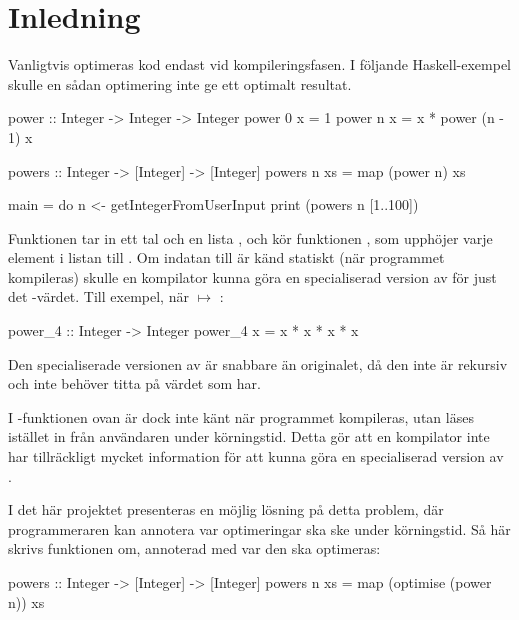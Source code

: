 \documentclass[Rapport]{subfiles}
\begin{document}
\section{Inledning}

Vanligtvis optimeras kod endast vid kompileringsfasen. I följande Haskell-exempel 
skulle en sådan optimering inte ge ett optimalt resultat.

\begin{codeEx}
power :: Integer -> Integer -> Integer
power 0 x = 1
power n x = x * power (n - 1) x

powers :: Integer -> [Integer] -> [Integer]
powers n xs = map (power n) xs

main = do
    n <- getIntegerFromUserInput
    print (powers n [1..100])

\end{codeEx}

Funktionen  tar in ett tal  och en lista , och kör funktionen , 
som upphöjer varje element i listan till .
Om indatan  till 
 är känd statiskt (när programmet kompileras) skulle en kompilator kunna 
göra en specialiserad version av  för just det -värdet. Till exempel, när  $\mapsto$ :

\begin{codeEx}
power_4 :: Integer -> Integer
power_4 x = x * x * x * x
\end{codeEx}

Den specialiserade versionen av  är snabbare än originalet, då den inte är 
rekursiv och inte behöver titta på värdet som  har.

I -funktionen ovan är dock  inte känt när programmet kompileras, utan läses 
istället in från användaren under körningstid. Detta gör att en kompilator inte 
har tillräckligt mycket information för att kunna göra en specialiserad version av .

I det här projektet presenteras en möjlig lösning på detta problem,
där programmeraren kan annotera var optimeringar ska ske under körningstid.
Så här skrivs funktionen  om,
annoterad med var den ska optimeras:

\begin{codeEx}
powers :: Integer -> [Integer] -> [Integer]
powers n xs = map (optimise (power n)) xs
\end{codeEx}
\end{document}
